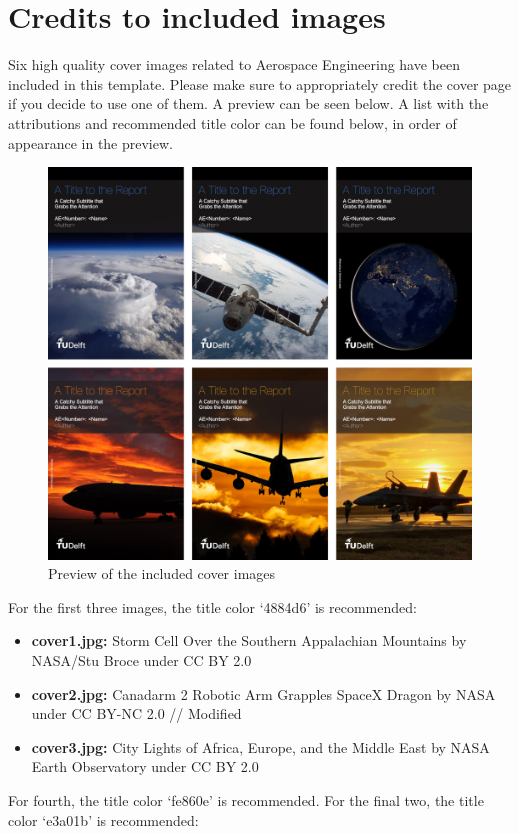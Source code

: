 \newpage
\section{Credits to included images}

Six high quality cover images related to Aerospace Engineering have been included in this template. Please make sure to appropriately credit the cover page if you decide to use one of them. A preview can be seen below. A list with the attributions and recommended title color can be found below, in order of appearance in the preview.

\begin{figure}[h]
    \centering
    \includegraphics[width=0.75\linewidth]{layout/covers/Covers.jpg}
    \caption{Preview of the included cover images}
\end{figure}

\noindent For the first three images, the title color `4884d6' is recommended:

\begin{itemize}
    \item \textbf{cover1.jpg:} Storm Cell Over the Southern Appalachian Mountains by NASA/Stu Broce under CC BY 2.0
    \item \textbf{cover2.jpg:} Canadarm 2 Robotic Arm Grapples SpaceX Dragon by NASA under CC BY-NC 2.0 // Modified
    \item \textbf{cover3.jpg:} City Lights of Africa, Europe, and the Middle East by NASA Earth Observatory under CC BY 2.0
\end{itemize}

\noindent For fourth, the title color `fe860e' is recommended. For the final two, the title color `e3a01b' is recommended:

